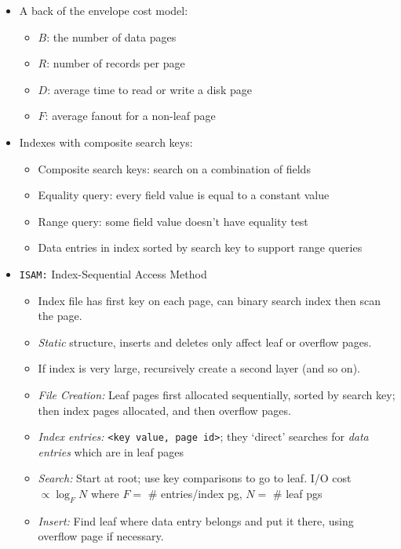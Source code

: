 \documentclass[landscape,8pt]{extarticle}
\newcommand{\code}{\lstinline}
\begin{document}
\begin{multicols}{5}
\begin{itemize}
        \item A back of the envelope cost model:
              \begin{itemize}
                  \item $B$: the number of data pages
                  \item $R$: number of records per page
                  \item $D$: average time to read or write a disk page
                  \item $F$: average fanout for a non-leaf page
              \end{itemize}
        \item Indexes with composite search keys:
              \begin{itemize}
                  \item Composite search keys: search on a combination of fields
                  \item Equality query: every field value is equal to a constant value
                  \item Range query: some field value doesn't have equality test
                  \item Data entries in index sorted by search key to support range queries
              \end{itemize}
        \item \code{ISAM:} Index-Sequential Access Method
              \begin{itemize}
                  \item Index file has first key on each page, can binary search index then scan the page.
                  \item \emph{Static} structure, inserts and deletes only affect leaf or overflow pages.
                  \item If index is very large, recursively create a second layer (and so on).
                  \item \emph{File Creation:} Leaf pages first allocated sequentially, sorted by search key; then index pages allocated, and then overflow pages.
                  \item \emph{Index entries:} \code{<key value, page id>}; they `direct' searches for \emph{data entries} which are in leaf pages
                  \item \emph{Search:} Start at root; use key comparisons to go to leaf. I/O cost $\propto \log_F N$ where $F = $ \# entries/index pg, $N = $ \# leaf pgs
                  \item \emph{Insert:} Find leaf where data entry belongs and put it there, using overflow page if necessary.

\end{itemize}
\end{itemize}
\end{multicols}
\end{document}
